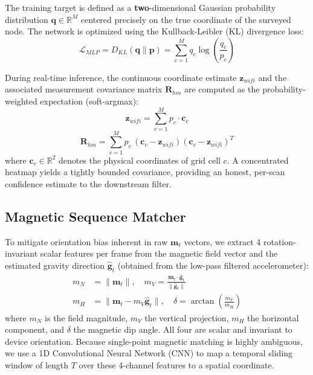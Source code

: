 \documentclass[conference]{IEEEtran}
\begin{document}
The training target is defined as a \textbf{\color{red}two}-dimensional Gaussian probability distribution $\mathbf{q} \in \mathbb{R}^M$ centered precisely on the true coordinate of the surveyed node. The network is optimized using the Kullback-Leibler (KL) divergence loss:
\begin{equation}
\mathcal{L}_{MLP} = D_{KL}(\mathbf{q} \parallel \mathbf{p}) = \sum_{c=1}^{M} q_c \log \left( \frac{q_c}{p_c} \right) \label{eq:kl_loss}
\end{equation}

During real-time inference, the continuous coordinate estimate $\mathbf{z}_{wifi}$ and the associated measurement covariance matrix $\mathbf{R}_{hm}$ are computed as the probability-weighted expectation (soft-argmax):
\begin{equation}
\mathbf{z}_{wifi} = \sum_{c=1}^{M} p_c \cdot \mathbf{c}_c \label{eq:heatmap_centroid}
\end{equation}
\begin{equation}
\mathbf{R}_{hm} = \sum_{c=1}^{M} p_c\,(\mathbf{c}_c - \mathbf{z}_{wifi})(\mathbf{c}_c - \mathbf{z}_{wifi})^T \label{eq:heatmap_cov}
\end{equation}
where $\mathbf{c}_c \in \mathbb{R}^2$ denotes the physical coordinates of grid cell $c$. A concentrated heatmap yields a tightly bounded covariance, providing an honest, per-scan confidence estimate to the downstream filter.

\subsection{Magnetic Sequence Matcher}

To mitigate orientation bias inherent in raw $\mathbf{m}_t$ vectors, we extract 4 rotation-invariant scalar features per frame from the magnetic field vector and the estimated gravity direction $\hat{\mathbf{g}}_t$ (obtained from the low-pass filtered accelerometer):
\begin{align}
m_N &= \|\mathbf{m}_t\|, \quad m_V = \frac{\mathbf{m}_t \cdot \hat{\mathbf{g}}_t}{\|\hat{\mathbf{g}}_t\|} \nonumber \\
m_H &= \|\mathbf{m}_t - m_V \hat{\mathbf{g}}_t\|, \quad \delta = \arctan\!\left(\frac{m_V}{m_H}\right) \label{eq:mag_features}
\end{align}
where $m_N$ is the field magnitude, $m_V$ the vertical projection, $m_H$ the horizontal component, and $\delta$ the magnetic dip angle. All four are scalar and invariant to device orientation. Because single-point magnetic matching is highly ambiguous, we use a 1D Convolutional Neural Network (CNN) to map a temporal sliding window of length $T$ over these 4-channel features to a spatial coordinate.
\end{document}
